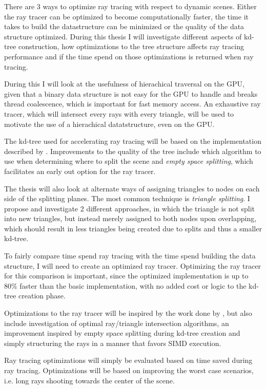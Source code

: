 There are 3 ways to optimize ray tracing with respect to dynamic
scenes. Either the ray tracer can be optimized to become
computationally faster, the time it takes to build the datastructure
can be minimized or the quality of the data structure
optimized. During this thesis I will investigate different aspects of
kd-tree construction, how optimizations to the tree structure affects
ray tracing performance and if the time spend on those optimizations
is returned when ray tracing.

During this I will look at the usefulness of hierachical traversal on
the GPU, given that a binary data structure is not easy for the GPU to
handle and breaks thread coalescence, which is important for fast
memory access. An exhaustive ray tracer, which will intersect every
rays with every triangle, will be used to motivate the use of a
hierachical datatstructure, even on the GPU.

The kd-tree used for accelerating ray tracing will be based on the
implementation described by \zhou.  Improvements to the quality of the
tree include which algorithm to use when determining where to split
the scene and \textit{empty space splitting}, which facilitates an
early out option for the ray tracer.

The thesis will also look at alternate ways of assigning triangles to
nodes on each side of the splitting planes. The most common technique
is \textit{triangle splitting}. I propose and investigate 2 different
approaches, in which the triangle is not split into new triangles, but
instead merely assigned to both nodes upon overlapping, which should
result in less triangles being created due to splits and thus a
smaller kd-tree.

To fairly compare time spend ray tracing with the time spend building
the data structure, I will need to create an optimized ray
tracer. Optimizing the ray tracer for this comparison is important,
since the optimized implementation is up to 80\% faster than the basic
implementation, with no added cost or logic to the kd-tree creation
phase.

Optimizations to the ray tracer will be inspired by the work done by
\horn , but also include investigation of optimal ray/triangle
intersection algorithms, an improvement inspired by empty space
splitting during kd-tree creation and simply structuring the rays in a
manner that favors SIMD execution.



Ray tracing optimizations will simply be evaluated based on time saved
during ray tracing. Optimizations will be based on improving the
worst case scenarios, i.e. long rays shooting towards the center of
the scene.

